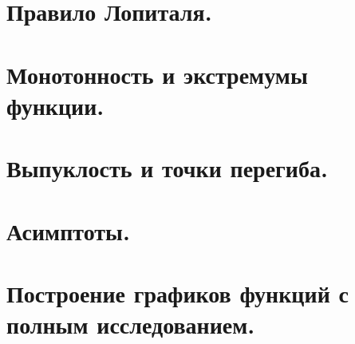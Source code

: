 \documentclass[12pt]{article}
\begin{document}
\begin{sloppypar}
    \section{Правило Лопиталя.}

    \section{Монотонность и экстремумы функции.}

    \section{Выпуклость и точки перегиба.}

    \section{Асимптоты.}

    \section{Построение графиков функций с полным исследованием.}


\end{sloppypar}
\end{document}
